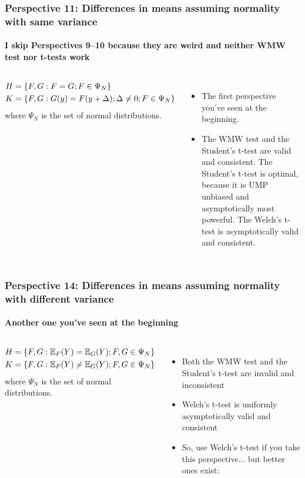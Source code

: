 \begin{frame}\frametitle{Perspective 11: Differences in means assuming normality with same variance}
\framesubtitle{I skip Perspectives 9--10 because they are weird and neither WMW test nor t-tests work}
	\begin{columns}
		\begin{per}
	\vspace{-1.5em}
	\begin{align*}\vspace{-1.5em}
		H &=\{F,G:F=G; F \in \Psi_N\}\\
		K &=\{F,G:G(y) = F(y+\Delta); \Delta \neq 0; F \in \Psi_N \}
	\end{align*}
	where $\Psi_N$ is the set of normal distributions.
\end{per}
\begin{itemize}
	\item The first perspective you've seen at the beginning.
	\item The WMW test and the Student's t-test are \alert{valid and consistent}. The Student's t-test is \alert{optimal}, because it is \alert{UMP unbiased} and \alert{asymptotically most powerful}. The Welch's t-test is \alert{asymptotically valid and consistent}.
\end{itemize}
	\end{columns}
\end{frame}


\begin{frame}\frametitle{Perspective 14: \large  Differences in means assuming normality with different variance}
	\framesubtitle{Another one you've seen at the beginning}
	\begin{columns}
		\column{0.95\linewidth}
		\begin{per}
			\vspace{-1.5em}
			\begin{align*}\vspace{-1.5em}
				H &=\{F,G:\mathbb{E}_F(Y)=\mathbb{E}_G(Y); F,G \in \Psi_N\}\\
				K &=\{F,G:\mathbb{E}_F(Y)\neq\mathbb{E}_G(Y); F,G \in \Psi_N\}
			\end{align*}
			where $\Psi_N$ is the set of normal distributions.
		\end{per}
		\begin{itemize}
			\item Both the WMW test and the Student's t-test are \alert{invalid and inconsistent}
			\item Welch's t-test is \alert{uniformly asymptotically valid} and \alert{consistent}
			\item So, use Welch's t-test if you take this perspective... but better ones exist:
		\end{itemize}
	\end{columns}
\end{frame}



